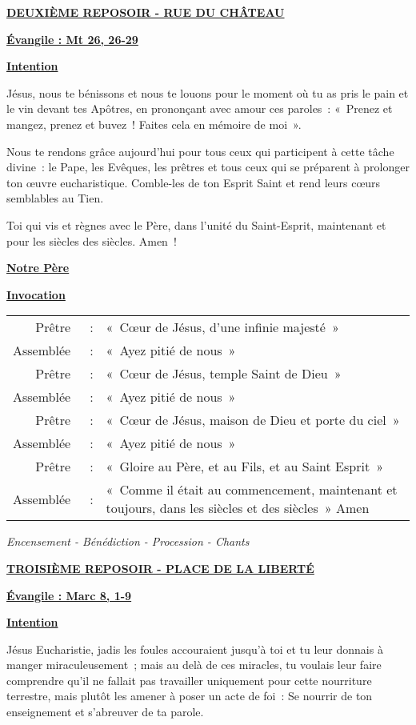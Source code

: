 \documentclass[french,11pt,a4paper]{article}
\newcommand{\NewsItem}[1]{%
\vspace{3pt}
\underline{\textbf{#1}}
		  }
\begin{document}
\NewsItem{DEUXIÈME REPOSOIR - RUE DU CHÂTEAU}

\NewsItem{Évangile : Mt 26, 26-29}

\NewsItem{Intention}

Jésus, nous te bénissons et nous te louons pour le moment où tu as pris le pain et le vin devant tes Apôtres, en prononçant avec amour ces paroles : « Prenez et mangez, prenez et buvez ! Faites cela en mémoire de moi ».

Nous te rendons grâce aujourd’hui pour tous ceux qui participent à cette tâche divine : le Pape, les Evêques, les prêtres et tous ceux qui se préparent à prolonger ton œuvre eucharistique. Comble-les de ton Esprit Saint et rend leurs cœurs semblables au Tien.

Toi qui vis et règnes avec le Père, dans l’unité du Saint-Esprit, maintenant et pour les siècles des siècles. Amen !

\NewsItem{Notre Père}

\NewsItem{Invocation}

\begin{tabular}{rcp{10cm}}
Prêtre & : &		« Cœur de Jésus, d’une infinie majesté » \\
Assemblée & : &	« Ayez pitié de nous » \\
Prêtre & : &		« Cœur de Jésus, temple Saint de Dieu » \\
Assemblée & : &	« Ayez pitié de nous » \\
Prêtre & : &		« Cœur de Jésus, maison de Dieu et porte du ciel » \\
Assemblée & : &	« Ayez pitié de nous » \\
Prêtre & : &		« Gloire au Père, et au Fils, et au Saint Esprit » \\
Assemblée & : &	« Comme il était au commencement, maintenant et toujours, dans les siècles et des siècles » Amen  \\
\end{tabular}
\emph{Encensement - Bénédiction - Procession - Chants}

\NewsItem{TROISIÈME REPOSOIR - PLACE DE LA LIBERTÉ}

\NewsItem{Évangile : Marc 8, 1-9}

\NewsItem{Intention}

Jésus Eucharistie, jadis les foules accouraient jusqu’à toi et tu leur donnais à manger miraculeusement ; mais au delà de ces miracles, tu voulais leur faire comprendre qu’il ne fallait pas travailler uniquement pour cette nourriture terrestre, mais plutôt les amener à poser un acte de foi : Se nourrir de ton enseignement et s’abreuver de ta parole.
\end{document}
